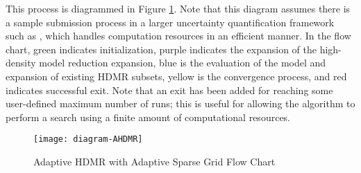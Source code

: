 This process is diagrammed in Figure \ref{fig:ahdmr}.  Note that this diagram assumes there is a sample
submission process in a larger uncertainty quantification framework such as \raven{}, which handles
computation resources in an efficient manner.  In the flow chart, green indicates initialization, purple
indicates the expansion of the high-density model reduction
expansion, blue is the evaluation of the model and expansion of existing HDMR subsets, yellow is the
convergence process, and red indicates successful exit.  Note that an exit has been added for reaching some
user-defined maximum number of runs; this is useful for allowing the algorithm to perform a search using a
finite amount of computational resources.
\begin{figure}[H]
  \centering
  \texttt{[image: diagram-AHDMR]}
  \caption{Adaptive HDMR with Adaptive Sparse Grid Flow Chart}
  \label{fig:ahdmr}
\end{figure}


